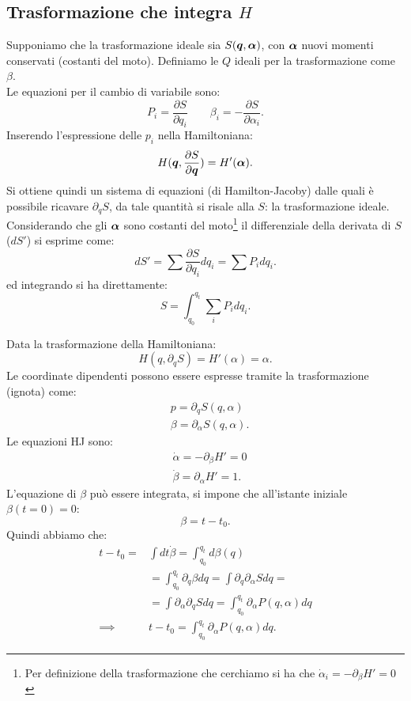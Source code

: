 \subsection{Trasformazione che integra $H$}%
\label{sub:Ricerca della trasformazione per integrare H}
Supponiamo che la trasformazione ideale sia $S(\boldsymbol{q}, \boldsymbol{\alpha})$, con $\boldsymbol{\alpha}$ nuovi momenti conservati (costanti del moto). Definiamo le $Q$ ideali per la trasformazione come $\beta$.\\
Le equazioni per il cambio di variabile sono:
\[
    P_i = \frac{\partial S}{\partial q_i} \qquad \beta_i = - \frac{\partial S}{\partial \alpha_i} 
.\] 
Inserendo l'espressione delle $p_i$ nella Hamiltoniana:
\[
    H(\boldsymbol{q}, \frac{\partial S}{\partial \boldsymbol{q}}) = H'(\boldsymbol{\alpha}) 
.\] 
Si ottiene quindi un sistema di equazioni (di Hamilton-Jacoby) dalle quali è possibile ricavare $\partial_{q}S$, da tale quantità si risale alla $S$: la trasformazione ideale.\\
Considerando che gli $\boldsymbol{\alpha}$ sono costanti del moto\footnote{Per definizione della trasformazione che cerchiamo si ha che $\dot{\alpha}_i = -\partial_{\beta}H' = 0$ }
il differenziale della derivata di $S$ ($dS'$) si esprime come:
\[
    dS' = \sum_{}^{} \frac{\partial S}{\partial q_i} dq_i = \sum_{}^{} P_idq_i
.\] 
ed integrando si ha direttamente:
\[
    S = \int_{q_0}^{q_t} \sum_{i}^{} P_idq_i 
.\] 
\begin{exmp}[Hamiltoniana 1D]
    Data la trasformazione della Hamiltoniana:
    \[
	H(q,\partial_{q}S) = H'(\alpha) = \alpha
    .\] 
    Le coordinate dipendenti possono essere espresse tramite la trasformazione (ignota) come:
    \begin{align}
	& p = \partial_{q}S(q, \alpha) \nonumber \\
	& \beta  = \partial_{\alpha}S(q, \alpha) 
	\label{eq:trasform_utile}
    .\end{align}
    Le equazioni HJ sono:
    \[\begin{aligned}
	&\dot{\alpha}= - \partial_{\beta} H' = 0\\
	&\dot{\beta} = \partial_{\alpha}H' = 1
    .\end{aligned}\]
    L'equazione di $\beta$ può essere integrata, si impone che all'istante iniziale $\beta (t=0) = 0$:
    \[
        \beta  = t-t_0
    .\] 
    Quindi abbiamo che:
    \begin{align}
	t-t_0 =& \int dt \dot{\beta} 
	       = \int_{q_0}^{q_t} d\beta (q) \nonumber\\
	       & = \int_{q_0}^{q_t} \partial_{q}\beta dq 
	       = \int  \partial_{q}\partial_{\alpha}S dq = \nonumber\\
	       & = \int\partial_{\alpha }\partial_{q}Sdq
	       = \int_{q_0}^{q_t} \partial_{\alpha}P(q, \alpha) dq \nonumber\\
	\implies  & t-t_0 = \int_{q_0}^{q_t} \partial_{\alpha}P(q, \alpha) dq \label{eq:periodo}
    .\end{align}
\end{exmp}
